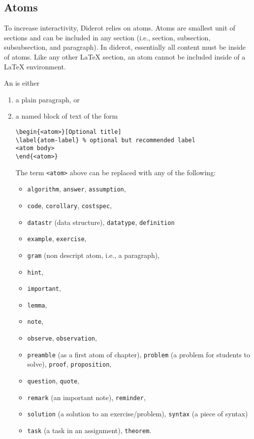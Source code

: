 \subsection{Atoms}
\label{sec:mtl::atoms}


\begin{definition}[Atom]
To increase interactivity, Diderot relies on atoms.
%
Atoms are smallest unit of sections and can be included in any section (i.e., section,  subsection, subsubsection, and paragraph).
%
In diderot, essentially all content  must be inside of atoms.
%
Like any other LaTeX section, an atom cannot be included inside of a
LaTeX environment.
%

An  is either
\begin{enumerate}
\item a plain paragraph, or
\item a named block of text of the form

\begin{lstlisting}
\begin{<atom>}[Optional title]
\label{atom-label} % optional but recommended label
<atom body>
\end{<atom>}
\end{lstlisting}
%
The term \lstinline`<atom>` above can be replaced with any of the following:
\begin{itemize}
\item \lstinline`algorithm`, \lstinline`answer`, \lstinline`assumption`,
\item \lstinline`code`, \lstinline`corollary`, \lstinline`costspec`,
\item \lstinline`datastr` (data structure), \lstinline`datatype`, \lstinline`definition`
\item \lstinline`example`, \lstinline`exercise`,
\item \lstinline`gram`  (non descript atom, i.e., a paragraph),
\item \lstinline`hint`, 
\item \lstinline`important`, 
\item \lstinline`lemma`,
\item \lstinline`note`,
\item \lstinline`observe`, \lstinline`observation`,
\item \lstinline`preamble` (as a  first atom of chapter), \lstinline`problem` (a problem for students to solve), \lstinline`proof`, \lstinline`proposition`,
\item \lstinline`question`, \lstinline`quote`,
\item \lstinline`remark` (an important note), \lstinline`reminder`,
\item \lstinline`solution` (a solution to an exercise/problem), \lstinline`syntax` (a piece of syntax)
\item \lstinline`task` (a task in an assignment), \lstinline`theorem`.
\end{itemize}
\end{enumerate}

\end{definition}

